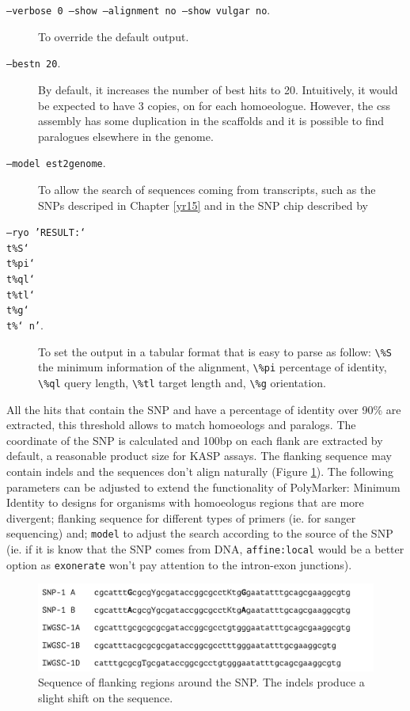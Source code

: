 \begin{description}

\item[\texttt{--verbose 0 --show --alignment no --show vulgar no}.] To override the default output. 
\item[\texttt{--bestn 20}.] By default, it increases the number of best hits to 20. Intuitively, it would be expected to have 3 copies, on for each homoeologue. However, the \acrshort{css} assembly has some duplication in the scaffolds and it is possible to find paralogues elsewhere in the genome. 
\item[\texttt{--model est2genome}.] To allow the search of sequences coming from transcripts, such as the SNPs descriped in Chapter \ref{yr15}  and in the SNP chip described by \citep{Allen2011}
\item[\texttt{--ryo 'RESULT:\char`\\t\%S\char`\\t\%pi\char`\\t\%ql\char`\\t\%tl\char`\\t\%g\char`\\t\%\char`\\n'}.]To set the output in a tabular format that is easy to parse as follow: \verb|\%S| the minimum information of the alignment, \verb|\%pi| percentage of identity, \verb|\%ql| query length, \verb|\%tl| target length and, \verb|\%g| orientation. 
\end{description}


All the hits that contain the SNP and have a percentage of identity over 90\% are extracted, this threshold allows to match homoeologs and paralogs. 
The coordinate of the SNP is calculated and 100bp on each flank are extracted by default, a reasonable product size for KASP assays. 
The flanking sequence may contain \acrshort{indels} and the sequences don't align naturally (Figure \ref{fig:poly:globalSequence}).
The following parameters can be adjusted to extend the functionality of PolyMarker: Minimum Identity to designs for organisms with homoeologus regions that are more divergent; flanking sequence for different types of primers (ie. for sanger sequencing) and;  \verb|model| to adjust the search according to the source of the SNP (ie. if it is know that the SNP comes from DNA, \verb|affine:local| would be a better option as \verb|exonerate| won't pay attention to the intron-exon junctions).

\begin{figure}
\includegraphics[width=1\textwidth]{PolyMarker/Figures/aln/scaffoldsFound.pdf}
\caption{Sequence of flanking regions around the SNP. The \acrshort{indels} produce a slight shift on the sequence.}
\label{fig:poly:globalSequence}
\end{figure}


